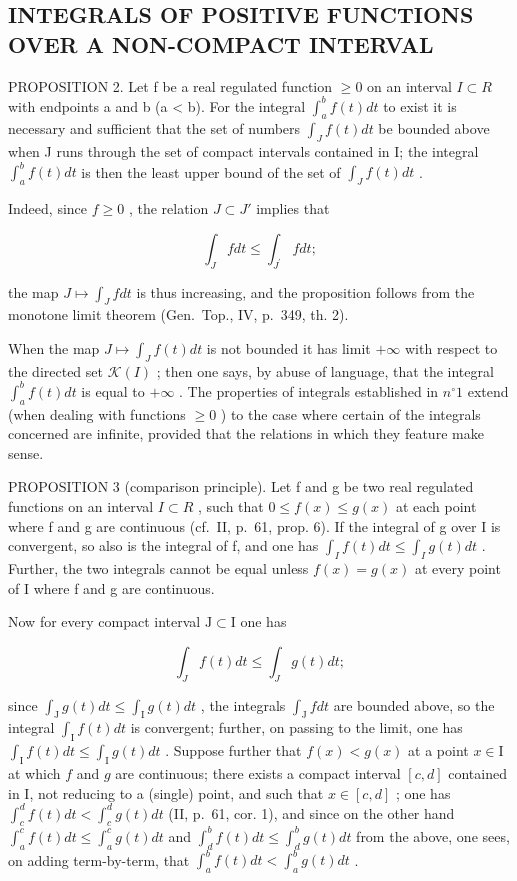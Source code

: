 \subsection{INTEGRALS OF POSITIVE FUNCTIONS OVER A NON-COMPACT INTERVAL}

PROPOSITION 2. Let f be a real regulated function \(\geqslant 0\) on an interval \(I \subset R\) with endpoints a and b (a \textless{} b). For the integral \(\int_{a}^{b} f(t) dt\) to exist it is necessary and sufficient that the set of numbers \(\int_{J} f(t) dt\) be bounded above when J runs through the set of compact intervals contained in I; the integral \(\int_{a}^{b} f(t) dt\) is then the least upper bound of the set of \(\int_{J} f(t) dt\) .

Indeed, since \(f \geqslant 0\) , the relation \(J \subset J'\) implies that

\[
\int_ {J} f d t \leqslant \int_ {J ^ {\prime}} f d t;
\]

the map \(J \mapsto \int_{J} f dt\) is thus increasing, and the proposition follows from the monotone limit theorem (Gen.~Top., IV, p.~349, th. 2).

When the map \(J \mapsto \int_{J} f(t) dt\) is not bounded it has limit \(+\infty\) with respect to the directed set \(\mathcal{K}(I)\) ; then one says, by abuse of language, that the integral \(\int_{a}^{b} f(t) dt\) is equal to \(+\infty\) . The properties of integrals established in \(n^{\circ} 1\) extend (when dealing with functions \(\geqslant 0\) ) to the case where certain of the integrals concerned are infinite, provided that the relations in which they feature make sense.

PROPOSITION 3 (comparison principle). Let f and g be two real regulated functions on an interval \(I \subset R\) , such that \(0 \leqslant f(x) \leqslant g(x)\) at each point where f and g are continuous (cf.~II, p.~61, prop. 6). If the integral of g over I is convergent, so also is the integral of f, and one has \(\int_{I} f(t) dt \leqslant \int_{I} g(t) dt\) . Further, the two integrals cannot be equal unless \(f(x) = g(x)\) at every point of I where f and g are continuous.

Now for every compact interval \(\mathrm{J} \subset \mathrm{I}\) one has

\[
\int_ {J} f (t) d t \leqslant \int_ {J} g (t) d t;
\]

since \(\int_{\mathrm{J}} g(t) dt \leqslant \int_{\mathrm{I}} g(t) dt\) , the integrals \(\int_{\mathrm{J}} f dt\) are bounded above, so the integral \(\int_{\mathrm{I}} f(t) dt\) is convergent; further, on passing to the limit, one has \(\int_{\mathrm{I}} f(t) dt \leqslant \int_{\mathrm{I}} g(t) dt\) . Suppose further that \(f(x) < g(x)\) at a point \(x \in \mathrm{I}\) at which \(f\) and \(g\) are continuous; there exists a compact interval \([c, d]\) contained in I, not reducing to a (single) point, and such that \(x \in [c, d]\) ; one has \(\int_{c}^{d} f(t) dt < \int_{c}^{d} g(t) dt\) (II, p.~61, cor. 1), and since on the other hand \(\int_{a}^{c} f(t) dt \leqslant \int_{a}^{c} g(t) dt\) and \(\int_{d}^{b} f(t) dt \leqslant \int_{d}^{b} g(t) dt\) from the above, one sees, on adding term-by-term, that \(\int_{a}^{b} f(t) dt < \int_{a}^{b} g(t) dt\) .

